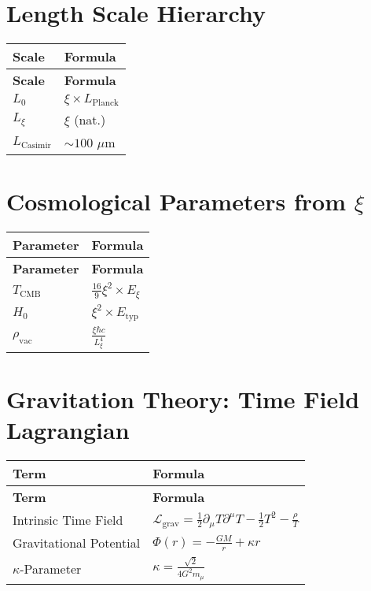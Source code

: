 \documentclass[12pt,a4paper]{article}
\begin{document}
	\section{Length Scale Hierarchy}
	
	\begin{longtable}{|p{3cm}|p{4cm}|}
		\hline
		\textbf{Scale} & \textbf{Formula} \\
		\hline
		\endfirsthead
		\hline
		\textbf{Scale} & \textbf{Formula} \\
		\hline
		\endhead
		\(L_0\) & \(\xi \times L_{\text{Planck}}\) \\
		\hline
		\(L_{\xi}\) & \(\xi\) (nat.) \\
		\hline
		\(L_{\text{Casimir}}\) & \(\sim 100\) \(\mu\)m \\
		\hline
	\end{longtable}
	
	\section{Cosmological Parameters from \(\xi\)}
	
	\begin{longtable}{|p{3cm}|p{4cm}|}
		\hline
		\textbf{Parameter} & \textbf{Formula} \\
		\hline
		\endfirsthead
		\hline
		\textbf{Parameter} & \textbf{Formula} \\
		\hline
		\endhead
		\(T_{\text{CMB}}\) & \(\frac{16}{9}\xi^{2} \times E_{\xi}\) \\
		\hline
		\(H_0\) & \(\xi^{2} \times E_{\text{typ}}\) \\
		\hline
		\(\rho_{\text{vac}}\) & \(\frac{\xi\hbar c}{L_{\xi}^{4}}\) \\
		\hline
	\end{longtable}
	
	\section{Gravitation Theory: Time Field Lagrangian}
	
	\begin{longtable}{|p{4cm}|p{5cm}|}
		\hline
		\textbf{Term} & \textbf{Formula} \\
		\hline
		\endfirsthead
		\hline
		\textbf{Term} & \textbf{Formula} \\
		\hline
		\endhead
		Intrinsic Time Field & \(\mathcal{L}_{\text{grav}} = \frac{1}{2}\partial_{\mu}T\partial^{\mu}T - \frac{1}{2}T^{2} - \frac{\rho}{T}\) \\
		\hline
		Gravitational Potential & \(\Phi(r) = -\frac{GM}{r} + \kappa r\) \\
		\hline
		\(\kappa\)-Parameter & \(\kappa = \frac{\sqrt{2}}{4G^{2}m_{\mu}}\) \\
		\hline
	\end{longtable}
	
\end{document}
